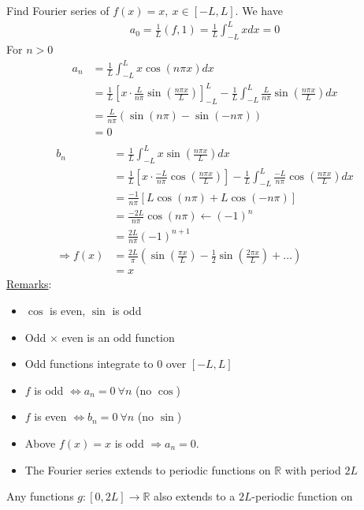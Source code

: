 \documentclass[12pt, letterpaper]{article}
\begin{document}
 Find Fourier series of $f(x) = x,\ x \in [-L,L]$. We have 
\begin{align*}
    a_0 = \frac 1L (f,1) = \frac 1L \int_{-L}^{L} xdx = 0
\end{align*}
For $n > 0$
\begin{align*}
    a_n &= \frac 1L \int_{-L}^{L}x\cos\left(n\pi x\right)dx \\
    &= \frac 1L \left[x\cdot \frac{L}{n\pi}\sin \left(\frac{n\pi x}{L}\right)\right]^L_{-L} - \frac{1}{L}\int_{-L}^{L} \frac{L}{n\pi} \sin\left(\frac{n\pi x}{L}\right) dx \\
    &= \frac{L}{n\pi} \left(\sin(n\pi) - \sin(-n\pi)\right) \\
    &= 0 \\
\end{align*}
\begin{align*}
    b_n &= \frac 1L \int_{-L}^{L} x\sin \left(\frac{n\pi x}{L}\right)dx \\
    &= \frac 1L \left[x \cdot \frac{-L}{n\pi}\cos\left(\frac{n\pi x}{L}\right)\right] - \frac{1}{L} \int_{-L}^{L} \frac{-L}{n\pi} \cos\left(\frac{n\pi x}{L}\right)dx \\
    &= \frac{-1}{n\pi} \left[L\cos(n\pi) + L \cos (-n\pi)\right] \\
    &= \frac{-2L}{n\pi} \cos(n\pi) \leftarrow (-1)^n \\
    &= \frac{2L}{n\pi}(-1)^{n+1} \\
    \Rightarrow f(x) &= \frac{2L}{\pi}\left(\sin\left(\frac{\pi x}{L}\right)-\frac 12 \sin\left(\frac{2\pi x}{L}\right)+\dots\right) \\
    &= x
\end{align*}
\underline{Remarks}:
\begin{itemize}
    \item $\cos$ is even, $\sin$ is odd
    \item Odd $\times$ even is an odd function 
    \item Odd functions integrate to 0 over $[-L,L]$
    \item $f$ is odd $\Leftrightarrow a_n = 0\ \forall n$ (no $\cos$)
    \item $f$ is even $\Leftrightarrow b_n = 0\ \forall n$ (no $\sin$)
    \item Above $f(x)=x$ is odd $\Rightarrow a_n = 0$.
    \item The Fourier series extends to periodic functions on $\mathbb{R}$ with period $2L$
\end{itemize}
Any functions $g:[0,2L]\rightarrow \mathbb{R}$ also extends to a $2L$-periodic function on 
\end{document}
